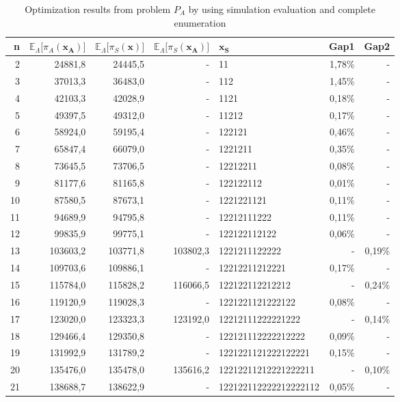 \documentclass[preprint,12pt]{elsarticle}
\begin{document}
\begin{table}[htbp]
  \centering
  \caption{Optimization results from problem $P_{A}$ by using simulation evaluation and complete enumeration}
    \begin{tabular}{rrrrlrr}
    \toprule
    n     & $\mathbb{E}_{\Lambda} \bigg[ \pi_{A}(\boldsymbol{x_{A}})\bigg]$ & $\mathbb{E}_{\Lambda} \bigg[ \pi_{S}(\boldsymbol{x})\bigg]$ & $\mathbb{E}_{\Lambda} \bigg[ \pi_{S}(\boldsymbol{x_{A}})\bigg]$ & $\boldsymbol{x_{S}}$ & Gap1  & Gap2 \\
    \midrule
    2     & 24881,8 & 24445,5 & -     & 11    & 1,78\% & - \\
    3     & 37013,3 & 36483,0 & -     & 112   & 1,45\% & - \\
    4     & 42103,3 & 42028,9 & -     & 1121  & 0,18\% & - \\
    5     & 49397,5 & 49312,0 & -     & 11212 & 0,17\% & - \\
    6     & 58924,0 & 59195,4 & -     & 122121 & 0,46\% & - \\
    7     & 65847,4 & 66079,0 & -     & 1221211 & 0,35\% & - \\
    8     & 73645,5 & 73706,5 & -     & 12212211 & 0,08\% & - \\
    9     & 81177,6 & 81165,8 & -     & 122122112 & 0,01\% & - \\
    10    & 87580,5 & 87673,1 & -     & 1221221121 & 0,11\% & - \\
    11    & 94689,9 & 94795,8 & -     & 12212111222 & 0,11\% & - \\
    12    & 99835,9 & 99775,1 & -     & 122122112122 & 0,06\% & - \\
    13    & 103603,2 & 103771,8 & 103802,3 & 1221211122222 & -     & 0,19\% \\
    14    & 109703,6 & 109886,1 & -     & 12212211212221 & 0,17\% & - \\
    15    & 115784,0 & 115828,2 & 116066,5 & 122122112212212 & -     & 0,24\% \\
    16    & 119120,9 & 119028,3 & -     & 1221221121222122 & 0,08\% & - \\
    17    & 123020,0 & 123323,3 & 123192,0 & 12212111222221222 & -     & 0,14\% \\
    18    & 129466,4 & 129350,8 & -     & 122121112222212222 & 0,09\% & - \\
    19    & 131992,9 & 131789,2 & -     & 1221221121222122221 & 0,15\% & - \\
    20    & 135476,0 & 135478,0 & 135616,2 & 12212211212221222211 & -     & 0,10\% \\
    21    & 138688,7 & 138622,9 & -     & 122122112222212222112 & 0,05\% & - \\
    \bottomrule
    \end{tabular}%
  \label{tab:stosimopti}%
\end{table}%
\end{document}

